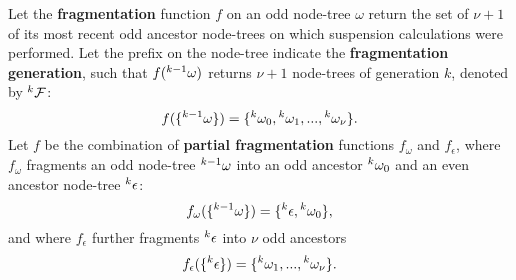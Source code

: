 
\begin{definition}\label{def:fragmentation}
  Let the \textbf{fragmentation} function $f$ on an odd node-tree $\omega$ return the set of $\nu + 1$ of its most recent odd ancestor node-trees on which suspension calculations were performed. Let the prefix on the node-tree indicate the \textbf{fragmentation generation}, such that $f({}^{k-1}\omega)$ returns $\nu + 1$ node-trees of generation $k$, denoted by ${}^{k}\mathcal{F}$:
  \begin{equation}\label{eq:fstep}
    f(\{\pre{k-1}\omega\}) = \{\pre{k}\omega_0,\pre{k}\omega_1,...,\pre{k}\omega_{\nu}\}.
  \end{equation}
  Let $f$ be the combination of \textbf{partial fragmentation} functions $f_\omega$ and $f_\epsilon$, where $f_\omega$ fragments an odd node-tree ${}^{k-1}\omega$ into an odd ancestor ${}^{k}\omega_0$ and an even ancestor node-tree ${}^{k}\epsilon$: 
  \begin{equation}\label{eq:pfo}
    f_\omega(\{\pre{k-1}\omega\}) = \{\pre{k}\epsilon, \pre{k}\omega_0 \},
  \end{equation}
  and where $f_\epsilon$ further fragments ${}^{k}\epsilon$ into $\nu$ odd ancestors
  \begin{equation}\label{eq:pfe}
    f_\epsilon(\{\pre{k}\epsilon\}) =\{\pre{k}\omega_1,...,\pre{k}\omega_{\nu}\}.
  \end{equation}

\end{definition}

